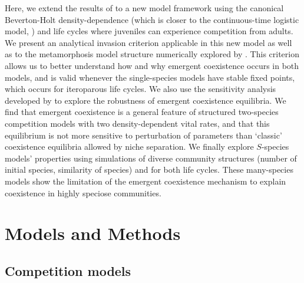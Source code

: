 \documentclass{article}
\begin{document}
Here, we extend the results of \citet{moll2008competition} to a new model framework using the canonical Beverton-Holt density-dependence (which is closer to the continuous-time logistic model, \citealp{cushing2004some}) and life cycles where juveniles can experience competition from adults. We present an analytical invasion criterion applicable in this new model as well as to the metamorphosis model structure numerically explored by \citet{moll2008competition}. This criterion allows us to better understand how and why emergent coexistence occurs in both models, and is valid whenever the single-species models have stable fixed points, which occurs for iteroparous life cycles. We also use the sensitivity analysis developed by \citet{barabas2014fixed} to explore the robustness of emergent coexistence equilibria. We find that emergent coexistence is a general feature of structured two-species competition models with two density-dependent vital rates, and that this equilibrium is not more sensitive to perturbation of parameters than `classic' coexistence equilibria allowed by niche separation. We finally explore $S$-species models' properties using simulations of diverse community structures (number of initial species, similarity of species) and for both life cycles. These many-species models show the limitation of the emergent coexistence mechanism to explain coexistence in highly speciose communities.

\section{Models and Methods}

\subsection{Competition models}
\end{document}
